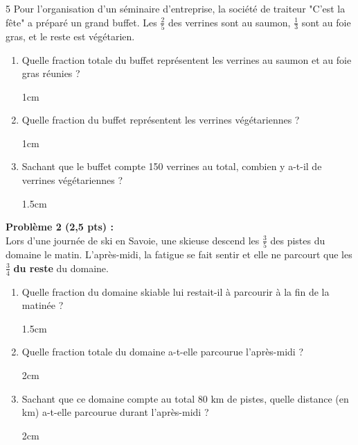 \documentclass[a4paper]{book}
\begin{document}
{    
    \begin{exerciceNote}{5}       
        Pour l'organisation d'un séminaire d'entreprise, la société de traiteur "C'est la fête" a préparé un grand buffet. Les $\frac{2}{5}$ des verrines sont au saumon, $\frac{1}{3}$ sont au foie gras, et le reste est végétarien.
        \begin{enumerate}
            \item Quelle fraction totale du buffet représentent les verrines au saumon et au foie gras réunies ?
            \begin{ZoneReponse}{1cm}
            \end{ZoneReponse}
            
            \item Quelle fraction du buffet représentent les verrines végétariennes ? 
            \begin{ZoneReponse}{1cm}
            \end{ZoneReponse}
            
            \item Sachant que le buffet compte 150 verrines au total, combien y a-t-il de verrines végétariennes ?
            \begin{ZoneReponse}{1.5cm}
            \end{ZoneReponse}
        \end{enumerate}
    
        \medskip
        
        \textbf{Problème 2 (2,5 pts) :}\\
        Lors d'une journée de ski en Savoie, une skieuse descend les $\frac{3}{5}$ des pistes du domaine le matin. L'après-midi, la fatigue se fait sentir et elle ne parcourt que les $\frac{3}{4}$ \textbf{du reste} du domaine.
        \begin{enumerate}
            \item Quelle fraction du domaine skiable lui restait-il à parcourir à la fin de la matinée ? 
            \begin{ZoneReponse}{1.5cm}
            \end{ZoneReponse}
            
            \item Quelle fraction totale du domaine a-t-elle parcourue l'après-midi ? 
            \begin{ZoneReponse}{2cm}
            \end{ZoneReponse}
            
            \item Sachant que ce domaine compte au total $80\text{ km}$ de pistes, quelle distance (en km) a-t-elle parcourue durant l'après-midi ?
            \begin{ZoneReponse}{2cm}
            \end{ZoneReponse}
        \end{enumerate}
    \end{exerciceNote}
    

}
\end{document}
